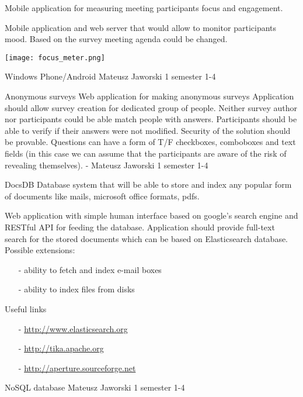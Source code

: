 \begin{project}
{}
{Mobile application for measuring meeting participants focus and engagement.}
{
Mobile application and web server that would allow to
monitor participants mood. Based on the survey meeting
agenda could be changed.
\begin{center}\texttt{[image: focus\_meter.png]}\end{center}
}
{Windows Phone/Android}
{Mateusz Jaworski}
{1 semester}
{1-4}
\end{project}
\begin{project}
{Anonymous surveys}
{Web application for making anonymous surveys}
{
Application should allow survey creation for dedicated group of people. 
Neither survey author nor participants could be able match people with answers.
Participants should be able to verify if their answers were not modified. 
Security of the solution should be provable. Questions can have a form of T/F
checkboxes, comboboxes and text fields (in this case we can assume that the
participants are aware of the risk of revealing themselves).
}
{-}
{Mateusz Jaworski}
{1 semester}
{1-4}
\end{project}
\begin{project}
{DocsDB}
{Database system that will be able to store and index any popular form of
documents like mails, microsoft office formats, pdfs.}
{
Web application with simple human interface based on google's search engine and
RESTful API for feeding the database.
Application should provide full-text search for the stored documents which can be based on Elasticsearch database.
Possible extensions:
\begin{itemize}
  \item[-] ability to fetch and index e-mail boxes
  \item[-] ability to index files from disks
\end{itemize}
Useful links
\begin{itemize}
  \item[-] \url{http://www.elasticsearch.org}
  \item[-] \url{http://tika.apache.org}
  \item[-] \url{http://aperture.sourceforge.net}
\end{itemize}
}
{NoSQL database}
{Mateusz Jaworski}
{1 semester}
{1-4}
\end{project}
